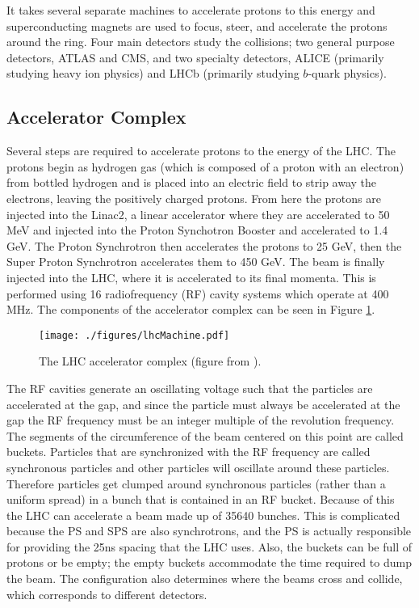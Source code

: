 It takes several separate machines to accelerate protons to this energy and superconducting magnets are used to focus, steer, and accelerate the protons around the ring.  Four main detectors study the collisions; two general purpose detectors, ATLAS and CMS, and two specialty detectors, ALICE (primarily studying heavy ion physics) and LHCb (primarily studying $b$-quark physics). \\%



\subsection{Accelerator Complex}

Several steps are required to accelerate protons to the energy of the LHC.  The protons begin as hydrogen gas (which is composed of a proton with an electron) from bottled hydrogen and is placed into an electric field to strip away the electrons, leaving the positively charged protons.  From here the protons are injected into the Linac2, a linear accelerator where they are accelerated to 50 MeV and injected into the Proton Synchotron Booster and accelerated to 1.4 GeV.  The Proton Synchrotron then accelerates the protons to 25 GeV, then the Super Proton Synchrotron accelerates them to 450 GeV.  The beam is finally injected into the LHC, where it is accelerated to its final momenta.  This is performed using 16 radiofrequency (RF) cavity systems which operate at 400 MHz.  The components of the accelerator complex can be seen in Figure \ref{fig:lhcMachine}.  \\

\begin{figure}[h!]
  \centering
	\texttt{[image: ./figures/lhcMachine.pdf]}
\caption[The LHC accelerator complex]{\label{fig:lhcMachine}{ The LHC accelerator complex (figure from \cite{LHC}).}}
\end{figure}

The RF cavities generate an oscillating voltage such that the particles are accelerated at the gap, and since the particle must always be accelerated at the gap the RF frequency must be an integer multiple of the revolution frequency.  The segments of the circumference of the beam centered on this point are called buckets.  Particles that are synchronized with the RF frequency are called synchronous particles and other particles will oscillate around these particles.  Therefore particles get clumped around synchronous particles (rather than a uniform spread) in a bunch that is contained in an RF bucket.  Because of this the LHC can accelerate a beam made up of 35640 bunches.  This is complicated because the PS and SPS are also synchrotrons, and the PS is actually responsible for providing the 25ns spacing that the LHC uses.  Also, the buckets can be full of protons or be empty; the empty buckets accommodate the time required to dump the beam.  The configuration also determines where the beams cross and collide, which corresponds to different detectors.   \\ %


